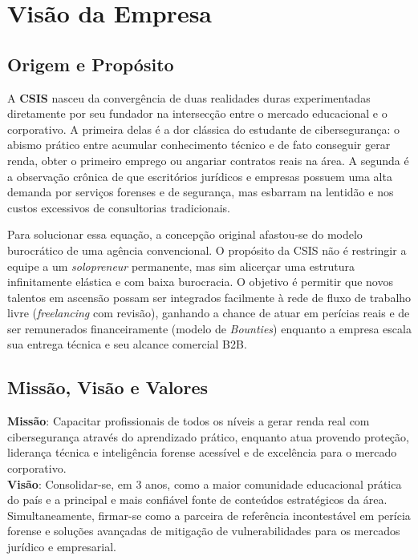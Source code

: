 \documentclass[../main.tex]{subfiles}
\begin{document}
\section{Visão da Empresa}

\subsection{Origem e Propósito}

A \textbf{CSIS} nasceu da convergência de duas realidades duras experimentadas diretamente por seu fundador na intersecção entre o mercado educacional e o corporativo. A primeira delas é a dor clássica do estudante de cibersegurança: o abismo prático entre acumular conhecimento técnico e de fato conseguir gerar renda, obter o primeiro emprego ou angariar contratos reais na área. A segunda é a observação crônica de que escritórios jurídicos e empresas possuem uma alta demanda por serviços forenses e de segurança, mas esbarram na lentidão e nos custos excessivos de consultorias tradicionais.

Para solucionar essa equação, a concepção original afastou-se do modelo burocrático de uma agência convencional. O propósito da CSIS não é restringir a equipe a um \textit{solopreneur} permanente, mas sim alicerçar uma estrutura infinitamente elástica e com baixa burocracia. O objetivo é permitir que novos talentos em ascensão possam ser integrados facilmente à rede de fluxo de trabalho livre (\textit{freelancing} com revisão), ganhando a chance de atuar em perícias reais e de ser remunerados financeiramente (modelo de \textit{Bounties}) enquanto a empresa escala sua entrega técnica e seu alcance comercial B2B.

\subsection{Missão, Visão e Valores}

\textbf{Missão}: Capacitar profissionais de todos os níveis a gerar renda real com cibersegurança através do aprendizado prático, enquanto atua provendo proteção, liderança técnica e inteligência forense acessível e de excelência para o mercado corporativo. \\

\textbf{Visão}: Consolidar-se, em 3 anos, como a maior comunidade educacional prática do país e a principal e mais confiável fonte de conteúdos estratégicos da área. Simultaneamente, firmar-se como a parceira de referência incontestável em perícia forense e soluções avançadas de mitigação de vulnerabilidades para os mercados jurídico e empresarial. \\
\end{document}
